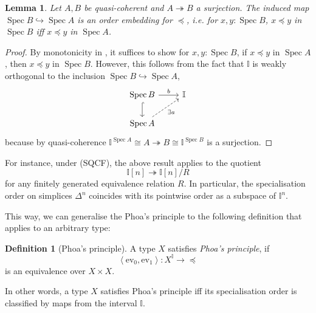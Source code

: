 \documentclass[12pt]{amsart}
\newtheorem{lemma}[theorem]{Lemma}
\theoremstyle{definition}
\newtheorem{definition}[theorem]{Definition}
\newtheorem{remark}[theorem]{Remark}
\newcommand{\mbb}[1]{\mathbb{#1}}
\newcommand{\I}{\mbb I}
\newcommand{\pair}[1]{\left\langle#1\right\rangle}
\newcommand{\ev}{\mathrm{ev}}
\newcommand{\surj}{\twoheadrightarrow}
\newcommand{\hook}{\hookrightarrow}
\newcommand{\spec}{\operatorname{Spec}}
\begin{document}
\begin{lemma}\label{lem:orderonaffine}
  Let $A,B$ be quasi-coherent and $A \surj B$ a surjection. The induced map $\spec B \hook \spec A$ is an order embedding for $\preceq$, i.e. for $x,y : \spec B$, $x \preceq y$ in $\spec B$ iff $x \preceq y$ in $\spec A$.
\end{lemma}
\begin{proof}
  By monotonicity in , it suffices to show for $x,y : \spec B$, if $x \preceq y$ in $\spec A$, then $x \preceq y$ in $\spec B$. However, this follows from the fact that $\I$ is weakly orthogonal to the inclusion $\spec B \hook \spec A$,
  \[
  \begin{tikzcd}
    \spec B \ar[d, hook] \ar[r, "b"] & \I \\ 
    \spec A \ar[ur, dashed, "\exists a"'] 
  \end{tikzcd}
  \]
  because by quasi-coherence $\I^{\spec A} \cong A \surj B \cong \I^{\spec B}$ is a surjection. 
\end{proof}

For instance, under (SQCF), the above result applies to the quotient 
\[ \I[n] \surj \I[n]/R \]
for any finitely generated equivalence relation $R$. In particular, the specialisation order on simplices $\Delta^n$ coincides with its pointwise order as a subspace of $\I^n$.

This way, we can generalise the Phoa's principle to the following definition that applies to an arbitrary type:

\begin{definition}[Phoa's principle]\label{def:phoa}
  A type $X$ satisfies \emph{Phoa's principle}, if 
  \[ \pair{\ev_0,\ev_1} : X^\I \to \operatorname{\preceq} \]
  is an equivalence over $X \times X$.
\end{definition}


In other words, a type $X$ satisfies Phoa's principle iff its specialisation order is classified by maps from the interval $\I$.
\end{document}
